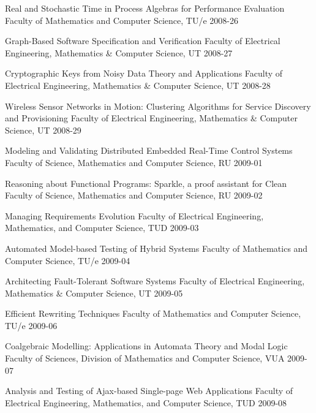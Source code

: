 \begin{multicols}{2}
         {Real and Stochastic Time in Process Algebras for Performance Evaluation}
         {Faculty of Mathematics and Computer Science, TU/e}
         {2008-26}


         {Graph-Based Software Specification and Verification}
         {Faculty of Electrical Engineering, Mathematics \& Computer Science, UT}
         {2008-27}

         {Cryptographic Keys from Noisy Data Theory and Applications}
         {Faculty of Electrical Engineering, Mathematics \& Computer Science, UT}
         {2008-28}

         {Wireless Sensor Networks in Motion: Clustering Algorithms for Service Discovery and Provisioning}
         {Faculty of Electrical Engineering, Mathematics \& Computer Science, UT}
         {2008-29}


         {Modeling and Validating Distributed Embedded Real-Time Control Systems}
         {Faculty of Science, Mathematics and Computer Science, RU}
         {2009-01}

         {Reasoning about Functional Programs: Sparkle, a proof assistant for Clean}
         {Faculty of Science, Mathematics and Computer Science, RU}
         {2009-02}

         {Managing Requirements Evolution}
         {Faculty of Electrical Engineering, Mathematics, and Computer Science, TUD}
         {2009-03}

         {Automated Model-based Testing of Hybrid Systems}
         {Faculty of Mathematics and Computer Science, TU/e}
         {2009-04}

         {Architecting Fault-Tolerant Software Systems}
         {Faculty of Electrical Engineering, Mathematics \& Computer Science, UT}
         {2009-05}

         {Efficient Rewriting Techniques}
         {Faculty of Mathematics and Computer Science, TU/e}
         {2009-06}

         {Coalgebraic Modelling: Applications in Automata Theory and Modal Logic}
         {Faculty of Sciences, Division of Mathematics and Computer Science, VUA}
         {2009-07}

         {Analysis and Testing of Ajax-based Single-page Web Applications}
         {Faculty of Electrical Engineering, Mathematics, and Computer Science, TUD}
         {2009-08}


\end{multicols}
